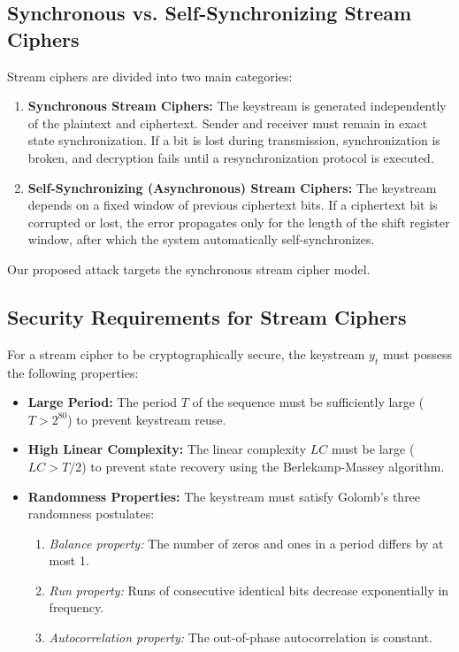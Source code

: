 \subsection{Synchronous vs. Self-Synchronizing Stream Ciphers}
Stream ciphers are divided into two main categories:
\begin{enumerate}
    \item \textbf{Synchronous Stream Ciphers:} The keystream is generated independently of the plaintext and ciphertext. Sender and receiver must remain in exact state synchronization. If a bit is lost during transmission, synchronization is broken, and decryption fails until a resynchronization protocol is executed.
    \item \textbf{Self-Synchronizing (Asynchronous) Stream Ciphers:} The keystream depends on a fixed window of previous ciphertext bits. If a ciphertext bit is corrupted or lost, the error propagates only for the length of the shift register window, after which the system automatically self-synchronizes.
\end{enumerate}
Our proposed attack targets the synchronous stream cipher model.

\subsection{Security Requirements for Stream Ciphers}
For a stream cipher to be cryptographically secure, the keystream $y_t$ must possess the following properties:
\begin{itemize}
    \item \textbf{Large Period:} The period $T$ of the sequence must be sufficiently large ($T > 2^{80}$) to prevent keystream reuse.
    \item \textbf{High Linear Complexity:} The linear complexity $LC$ must be large ($LC > T/2$) to prevent state recovery using the Berlekamp-Massey algorithm.
    \item \textbf{Randomness Properties:} The keystream must satisfy Golomb's three randomness postulates:
    \begin{enumerate}
        \item \textit{Balance property:} The number of zeros and ones in a period differs by at most 1.
        \item \textit{Run property:} Runs of consecutive identical bits decrease exponentially in frequency.
        \item \textit{Autocorrelation property:} The out-of-phase autocorrelation is constant.
    \end{enumerate}
\end{itemize}

